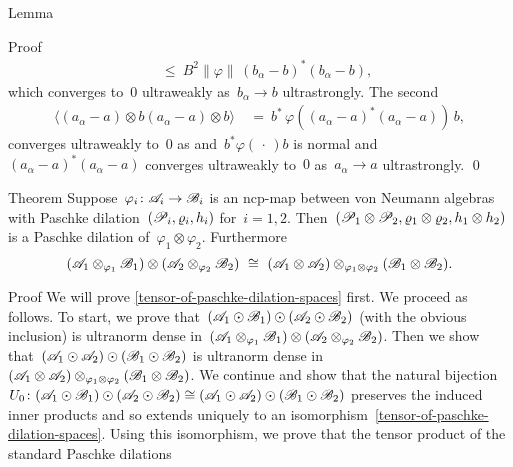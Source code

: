 \documentclass[b]{subfiles}
\begin{document}
\begin{parsec}
\begin{point}{Lemma}
\begin{point}{Proof}
\begin{align*}
    & \ \leq \ 
    B^2 \|\varphi\| \,(b_\alpha - b)^*  (b_\alpha - b),
\end{align*}
which converges to~$0$ ultraweakly as~$b_\alpha \to b$ ultrastrongly.
The second
\begin{align*}
    \langle
        (a_\alpha - a) \otimes b
        (a_\alpha - a) \otimes b \rangle
        & \ = \ 
        b^* \,\varphi((a_\alpha - a)^* (a_\alpha - a)) \, b,
\end{align*}
converges ultraweakly to~$0$
as and~$ b^* \varphi(\,\cdot\,) b$ is normal
and~$(a_\alpha - a)^*(a_\alpha - a)$ converges ultraweakly to~$0$
as~$a_\alpha \to a$ ultrastrongly. \qed
\end{point}
\end{point}
\end{parsec}

\begin{parsec}%
\begin{point}[paschke-tensor]{Theorem}%
Suppose~$\varphi_i \colon \mathscr{A}_i \to \mathscr{B}_i$
    is an ncp-map between von Neumann algebras
    with Paschke dilation~$(\mathscr{P}_i, \varrho_i, h_i)$
    for~$i=1,2$.
Then~$(\mathscr{P}_1 \otimes \mathscr{P}_2, \varrho_1 \otimes \varrho_2, h_1\otimes h_2)$
    is a Paschke dilation of~$\varphi_1 \otimes \varphi_2$.
    Furthermore
\begin{equation}\label{tensor-of-paschke-dilation-spaces}
(\scrA_1 \otimes_{\varphi_1} \scrB_1)
\otimes (\scrA_2 \otimes_{\varphi_2} \scrB_2)
\ \cong \ 
(\scrA_1 \otimes \scrA_2) \otimes_{\varphi_1\otimes \varphi_2} (\scrB_1 \otimes \scrB_2).
\end{equation}
\begin{point}{Proof}%
We will prove \eqref{tensor-of-paschke-dilation-spaces} first.
We proceed as follows.
To start, we prove that~$
(\mathscr{A}_1 \odot \mathscr{B}_1) \odot (\mathscr{A}_2 \odot \mathscr{B}_2)$
    (with the obvious inclusion)
    is ultranorm dense in~$(\mathscr{A}_1 \otimes_{\varphi_1} \mathscr{B}_1)
\otimes (\mathscr{A}_2 \otimes_{\varphi_2} \mathscr{B}_2)$.
Then we show that~$
(\mathscr{A}_1 \odot \mathscr{A}_2) \odot (\mathscr{B}_1 \odot \mathscr{B}_2) $
is ultranorm dense in~$
(\mathscr{A}_1 \otimes \mathscr{A}_2) \otimes_{\varphi_1\otimes \varphi_2} (\mathscr{B}_1 \otimes \mathscr{B}_2)$.
We continue and show that the natural bijection
$U_0\colon (\mathscr{A}_1 \odot \mathscr{B}_1) \odot (\mathscr{A}_2 \odot \mathscr{B}_2) \cong
(\mathscr{A}_1 \odot \mathscr{A}_2) \odot (\mathscr{B}_1 \odot \mathscr{B}_2) $
preserves the induced inner products and
    so extends uniquely to an
    isomorphism~\eqref{tensor-of-paschke-dilation-spaces}.
Using this isomorphism,
    we prove that the tensor product of the standard Paschke dilations

\end{point}
\end{point}
\end{parsec}
\end{document}
